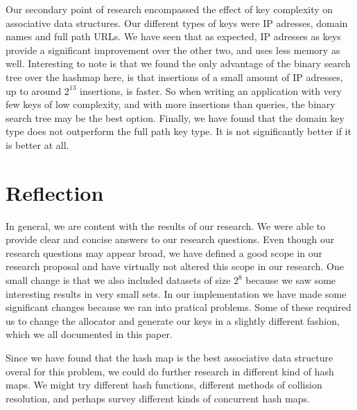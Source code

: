 \documentclass[12pt,a4paper]{article}
\begin{document}
    Our secondary point of research encompassed the effect of key complexity on associative data structures.
    Our different types of keys were IP adresses, domain names and full path URLs. We have seen that as expected,
    IP adresses as keys provide a significant improvement over the other two, and uses less memory as well. Interesting to
    note is that we found the only advantage of the binary search tree over the hashmap here, is that insertions of
    a small amount of IP adresses, up to around $2^13$ insertions, is faster. So when writing an application with very
    few keys of low complexity, and with more insertions than queries, the binary search tree may be the best option. Finally,
    we have found that the domain key type does not outperform the full path key type. It is not significantly better
    if it is better at all.
    
    \section{Reflection}
    In general, we are content with the results of our research. We were able to provide clear and concise answers to our
    research questions. Even though our research questions may appear broad, we have defined a good scope in our research
    proposal and have virtually not altered this scope in our research. One small change is that we also included datasets of
    size $2^8$ because we saw some interesting results in very small sets. In our implementation we have made some significant
    changes because we ran into pratical problems. Some of these required us to change the allocator and generate our keys
    in a slightly different fashion, which we all documented in this paper.
    
    Since we have found that the hash map is the best associative data structure overal for this problem, we could do further
    research in different kind of hash maps. We might try different hash functions, different methods of collision resolution,
    and perhaps survey different kinds of concurrent hash maps.

    

    
\end{document}
